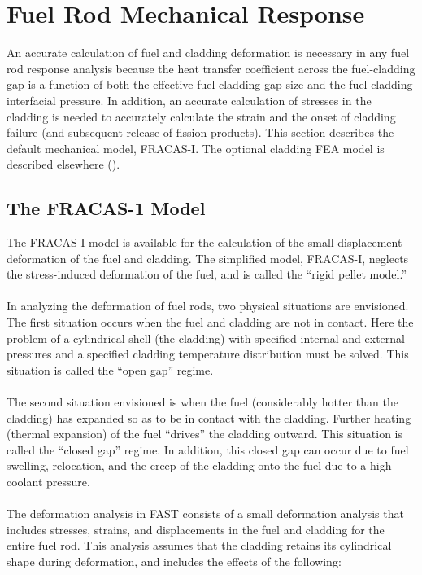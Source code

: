 \section{Fuel Rod Mechanical Response}\label{section:fuel-rod-mechanical-response}

An accurate calculation of fuel and cladding deformation is necessary in any fuel rod response
analysis because the heat transfer coefficient across the fuel-cladding gap is a function of both
the effective fuel-cladding gap size and the fuel-cladding interfacial pressure. In addition, an
accurate calculation of stresses in the cladding is needed to accurately calculate the strain and
the onset of cladding failure (and subsequent release of fission products). This section describes
the default mechanical model, FRACAS-I. The optional cladding FEA model is described elsewhere
(\cite{ref:Knuutila2006a}).


\subsection{The FRACAS-1 Model}\label{section:the-fracas-1-model}

The FRACAS-I model is available for the calculation of the small displacement deformation of the
fuel and cladding. The simplified model, FRACAS-I, neglects the stress-induced deformation of the
fuel, and is called the ``rigid pellet model.''
\\
\\
In analyzing the deformation of fuel rods, two physical situations are envisioned. The first
situation occurs when the fuel and cladding are not in contact. Here the problem of a cylindrical
shell (the cladding) with specified internal and external pressures and a specified cladding
temperature distribution must be solved. This situation is called the ``open gap'' regime.
\\
\\
The second situation envisioned is when the fuel (considerably hotter than the cladding) has
expanded so as to be in contact with the cladding. Further heating (thermal expansion) of the fuel
``drives'' the cladding outward. This situation is called the ``closed gap'' regime. In addition,
this closed gap can occur due to fuel swelling, relocation, and the creep of the cladding onto the
fuel due to a high coolant pressure.
\\
\\
The deformation analysis in FAST consists of a small deformation analysis that includes stresses,
strains, and displacements in the fuel and cladding for the entire fuel rod. This analysis assumes
that the cladding retains its cylindrical shape during deformation, and includes the effects of the
following:

